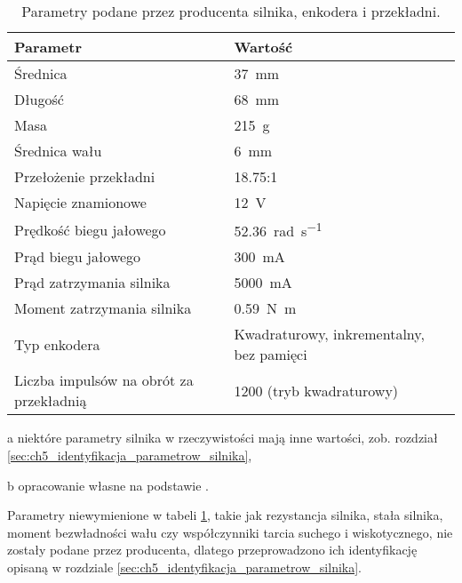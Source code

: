 \begin{table}[H]
    \centering
    \begin{threeparttable}
        \caption{Parametry podane przez producenta silnika, enkodera i przekładni.}
        \label{tab:parametry_silnika}
        
        \begin{tabularx}{0.9\textwidth}{l | l}
            \toprule
            Parametr & Wartość \\
            \midrule
            Średnica & \SI{37}{\milli\meter} \\
            Długość & \SI{68}{\milli\meter} \\
            Masa & \SI{215}{g} \\
            Średnica wału & \SI{6}{\milli\meter} \\
            \midrule
            Przełożenie przekładni & \num{18,75}:\num{1} \\
            \midrule
            Napięcie znamionowe & \SI{12}{\volt} \\
            Prędkość biegu jałowego & \SI{52,36}{\radian\per\second} \\
            Prąd biegu jałowego & \SI{300}{\milli\ampere} \\
            Prąd zatrzymania silnika & \SI{5000}{\milli\ampere} \\
            Moment zatrzymania silnika & \SI{0,59}{\newton\meter} \\
            \midrule
            Typ enkodera & Kwadraturowy, inkrementalny, bez pamięci \\
            Liczba impulsów na obrót za przekładnią & \num{1200} (tryb kwadraturowy) \\
            \bottomrule
        \end{tabularx}
        
        \begin{tablenotes}
            \footnotesize
            \item[a] niektóre parametry silnika w rzeczywistości mają inne wartości, zob. rozdział \ref{sec:ch5_identyfikacja_parametrow_silnika},
            \item[b] opracowanie własne na podstawie \cite{SILNIK_MANUAL}.
        \end{tablenotes}
    \end{threeparttable}
\end{table}

Parametry niewymienione w tabeli \ref{tab:parametry_silnika}, takie jak rezystancja silnika, stała silnika, moment bezwładności wału czy współczynniki tarcia suchego i wiskotycznego, nie zostały podane przez producenta, dlatego przeprowadzono ich identyfikację opisaną w rozdziale \ref{sec:ch5_identyfikacja_parametrow_silnika}.

